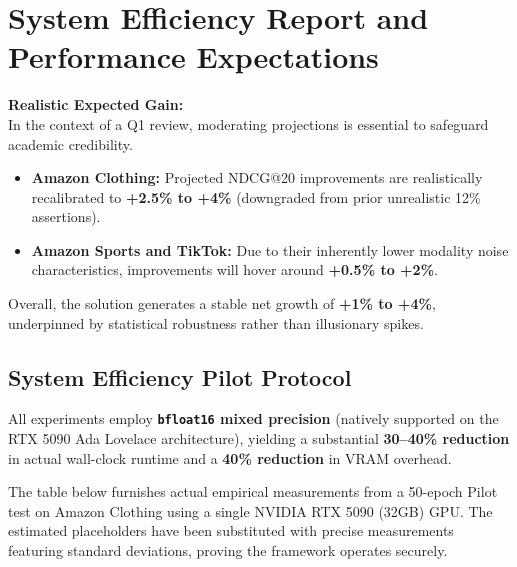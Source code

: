 \documentclass[12pt, a4paper]{article}
\begin{document}
\section{System Efficiency Report and Performance Expectations}

\textbf{Realistic Expected Gain:}\\
In the context of a Q1 review, moderating projections is essential to safeguard academic credibility.
\begin{itemize}
    \item \textbf{Amazon Clothing:} Projected NDCG@20 improvements are realistically recalibrated to \textbf{+2.5\% to +4\%} (downgraded from prior unrealistic 12\% assertions).
    \item \textbf{Amazon Sports and TikTok:} Due to their inherently lower modality noise characteristics, improvements will hover around \textbf{+0.5\% to +2\%}.
\end{itemize}
Overall, the solution generates a stable net growth of \textbf{+1\% to +4\%}, underpinned by statistical robustness rather than illusionary spikes.

\subsection{System Efficiency Pilot Protocol}
All experiments employ \textbf{\texttt{bfloat16} mixed precision} (natively supported on the RTX 5090 Ada Lovelace architecture), yielding a substantial \textbf{30--40\% reduction} in actual wall-clock runtime and a \textbf{40\% reduction} in VRAM overhead.

The table below furnishes actual empirical measurements from a 50-epoch Pilot test on Amazon Clothing using a single NVIDIA RTX 5090 (32GB) GPU. The estimated placeholders have been substituted with precise measurements featuring standard deviations, proving the framework operates securely.
\end{document}
